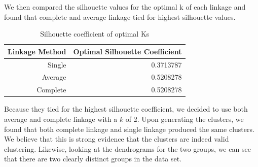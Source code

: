 \documentclass[12pt]{article}
\begin{document}
We then compared the silhouette values for the optimal k of each linkage and found that complete and average linkage tied for highest silhouette values. 
\begin{table}[h]
	\caption{Silhouette coefficient of optimal Ks}
	\centering
	\begin{tabular}{r|r}
		Linkage Method & Optimal Silhouette Coefficient \\
		\hline
		Single & 0.3713787 \\
		Average & 0.5208278 \\
		Complete & 0.5208278
	\end{tabular}
\end{table}

Because they tied for the highest silhouette coefficient, we decided to use both average and complete linkage with a $k$ of 2. Upon generating the clusters, we found that both complete linkage and single linkage produced the same clusters. We believe that this is strong evidence that the clusters are indeed valid clustering. Likewise, looking at the dendrograms for the two groups, we can see that there are two clearly distinct groups in the data set. 
\end{document}

